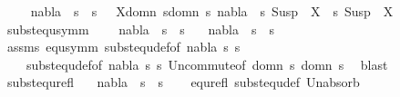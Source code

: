 \begin{isabellebody}
\ \ \isanewline
\ \ {\isachardoublequoteopen}nabla\ {\isasymTurnstile}\ s{}\ {\isasymapprox}\ s{}\ {\isasymequiv}\ \ {\isasymforall}X{\isasymin}{\isacharparenleft}{\kern0pt}domn\ s{}{\isasymunion}domn\ s{}{\isacharparenright}{\kern0pt}{\isachardot}{\kern0pt}\ {\isacharparenleft}{\kern0pt}nabla\ {\isasymturnstile}\ s{}\ {\isacharparenleft}{\kern0pt}Susp\ {\isacharbrackleft}{\kern0pt}{\isacharbrackright}{\kern0pt}\ X{\isacharparenright}{\kern0pt}\ {\isasymapprox}\ s{}\ {\isacharparenleft}{\kern0pt}Susp\ {\isacharbrackleft}{\kern0pt}{\isacharbrackright}{\kern0pt}\ X{\isacharparenright}{\kern0pt}{\isacharparenright}{\kern0pt}{\isachardoublequoteclose}\isanewline
\isanewline
{}\isamarkupfalse%
\ subst{\isacharunderscore}{\kern0pt}equ{\isacharunderscore}{\kern0pt}symm{\isacharcolon}{\kern0pt}\ \isanewline
\ \ \ {\isachardoublequoteopen}nabla\ {\isasymTurnstile}\ s{}\ {\isasymapprox}\ s{}{\isachardoublequoteclose}\isanewline
\ \ \ {\isachardoublequoteopen}nabla\ {\isasymTurnstile}\ s{}\ {\isasymapprox}\ s{}{\isachardoublequoteclose}\isanewline
%
\isadelimproof
\ \ %
\endisadelimproof
%
\isatagproof
{}\isamarkupfalse%
\ assms\ equ{\isacharunderscore}{\kern0pt}symm\ subst{\isacharunderscore}{\kern0pt}equ{\isacharunderscore}{\kern0pt}def{\isacharbrackleft}{\kern0pt}of\ nabla\ s{}\ s{}{\isacharbrackright}{\kern0pt}\isanewline
\ \ \ \ subst{\isacharunderscore}{\kern0pt}equ{\isacharunderscore}{\kern0pt}def{\isacharbrackleft}{\kern0pt}of\ nabla\ s{}\ s{}{\isacharbrackright}{\kern0pt}\ Un{\isacharunderscore}{\kern0pt}commute{\isacharbrackleft}{\kern0pt}of\ {\isacartoucheopen}domn\ s{}{\isacartoucheclose}\ {\isacartoucheopen}domn\ s{}{\isacartoucheclose}{\isacharbrackright}{\kern0pt}\ \isamarkupfalse%
\ blast%
\endisatagproof
{\isafoldproof}%
%
\isadelimproof
\isanewline
%
\endisadelimproof
\isanewline
{}\isamarkupfalse%
\ subst{\isacharunderscore}{\kern0pt}equ{\isacharunderscore}{\kern0pt}refl{\isacharcolon}{\kern0pt}\isanewline
\ \ \ {\isachardoublequoteopen}nabla\ {\isasymTurnstile}\ s\ {\isasymapprox}\ s{\isachardoublequoteclose}\isanewline
%
\isadelimproof
\ \ %
\endisadelimproof
%
\isatagproof
{}\isamarkupfalse%
\ equ{\isacharunderscore}{\kern0pt}refl\ subst{\isacharunderscore}{\kern0pt}equ{\isacharunderscore}{\kern0pt}def\ Un{\isacharunderscore}{\kern0pt}absorb\ \isamarkupfalse%

\end{isabellebody}
